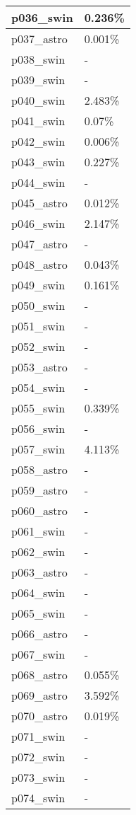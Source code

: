 \documentclass{article}%
\begin{document}
\begin{longtabu}{X[l] X[r]}
\hline%
p036\_swin&0.236\%\\%
\hline%
p037\_astro&0.001\%\\%
\hline%
p038\_swin&{-}\\%
\hline%
p039\_swin&{-}\\%
\hline%
p040\_swin&2.483\%\\%
\hline%
p041\_swin&0.07\%\\%
\hline%
p042\_swin&0.006\%\\%
\hline%
p043\_swin&0.227\%\\%
\hline%
p044\_swin&{-}\\%
\hline%
p045\_astro&0.012\%\\%
\hline%
p046\_swin&2.147\%\\%
\hline%
p047\_astro&{-}\\%
\hline%
p048\_astro&0.043\%\\%
\hline%
p049\_swin&0.161\%\\%
\hline%
p050\_swin&{-}\\%
\hline%
p051\_swin&{-}\\%
\hline%
p052\_swin&{-}\\%
\hline%
p053\_astro&{-}\\%
\hline%
p054\_swin&{-}\\%
\hline%
p055\_swin&0.339\%\\%
\hline%
p056\_swin&{-}\\%
\hline%
p057\_swin&4.113\%\\%
\hline%
p058\_astro&{-}\\%
\hline%
p059\_astro&{-}\\%
\hline%
p060\_astro&{-}\\%
\hline%
p061\_swin&{-}\\%
\hline%
p062\_swin&{-}\\%
\hline%
p063\_astro&{-}\\%
\hline%
p064\_swin&{-}\\%
\hline%
p065\_swin&{-}\\%
\hline%
p066\_astro&{-}\\%
\hline%
p067\_swin&{-}\\%
\hline%
p068\_astro&0.055\%\\%
\hline%
p069\_astro&3.592\%\\%
\hline%
p070\_astro&0.019\%\\%
\hline%
p071\_swin&{-}\\%
\hline%
p072\_swin&{-}\\%
\hline%
p073\_swin&{-}\\%
\hline%
p074\_swin&{-}\\%

\end{longtabu}
\end{document}
